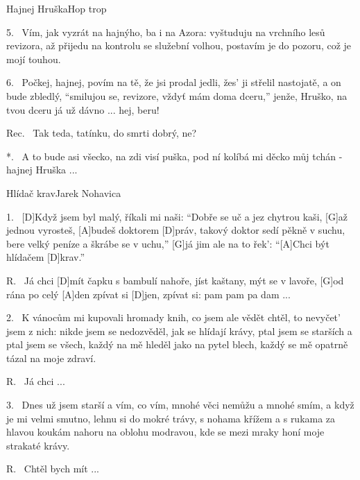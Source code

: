 \begin{song}{Hajnej Hruška}{Hop trop}
\begin{xverse}{5.~}
Vím, jak vyzrát na hajnýho, ba i na Azora:
vyštuduju na vrchního lesů revizora,
až přijedu na kontrolu se služební volhou,
postavím je do pozoru, což je mojí touhou.
\end{xverse}

\begin{xverse}{6.~}
Počkej, hajnej, povím na tě, že jsi prodal jedli,
žes' ji střelil nastojatě, a on bude zbledlý,
``smilujou se, revizore, vždyť mám doma dceru,''
jenže, Hruško, na tvou dceru já už dávno ... hej, beru!
\end{xverse}

\begin{xverse}{Rec.~}
Tak teda, tatínku, do smrti dobrý, ne?
\end{xverse}

\begin{xverse}{*.~}
A to bude asi všecko, na zdi visí puška,
pod ní kolíbá mi děcko můj tchán - hajnej Hruška ...
\end{xverse}

\end{song}

\begin{song}{Hlídač krav}{Jarek Nohavica}

\begin{xverse}{1.~}
[D]Když jsem byl malý, říkali mi naši:
``Dobře se uč a jez chytrou kaši,
[G]až jednou vyrosteš, [A]budeš doktorem [D]práv,
takový doktor sedí pěkně v suchu,
bere velký peníze a škrábe se v uchu,''
[G]já jim ale na to řek': ``[A]Chci být hlídačem [D]krav.''
\end{xverse}

\begin{xverse}{R.~}
Já chci [D]mít čapku s bambulí nahoře,
jíst kaštany, mýt se v lavoře,
[G]od rána po celý [A]den zpívat si [D]jen,
zpívat si: pam pam pa dam ...
\end{xverse}

\begin{xverse}{2.~}
K vánocům mi kupovali hromady knih,
co jsem ale vědět chtěl, to nevyčet' jsem z nich:
nikde jsem se nedozvěděl, jak se hlídají krávy,
ptal jsem se starších a ptal jsem se všech,
každý na mě hleděl jako na pytel blech,
každý se mě opatrně tázal na moje zdraví.
\end{xverse}

\begin{xverse}{R.~}
Já chci ...
\end{xverse}

\begin{xverse}{3.~}
Dnes už jsem starší a vím, co vím,
mnohé věci nemůžu a mnohé smím,
a když je mi velmi smutno, lehnu si do mokré trávy,
s nohama křížem a s rukama za hlavou
koukám nahoru na oblohu modravou,
kde se mezi mraky honí moje strakaté krávy.
\end{xverse}

\begin{xverse}{R.~}
Chtěl bych mít ...
\end{xverse}

\end{song}


